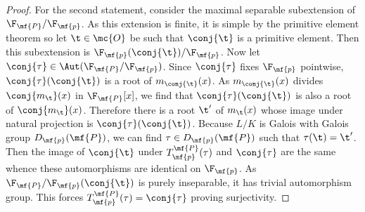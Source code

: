 \begin{proof}
      For the second statement, consider the maximal separable subextension of \(\F_{\mf{P}}/\F_{\mf{p}}\). As this extension is finite, it is simple by the primitive element theorem so let \(\t \in \mc{O}\) be such that \(\conj{\t}\) is a primitive element. Then this subextension is \(\F_{\mf{p}}(\conj{\t})/\F_{\mf{p}}\). Now let \(\conj{\tau} \in \Aut(\F_{\mf{P}}/\F_{\mf{p}})\). Since \(\conj{\tau}\) fixes \(\F_{\mf{p}}\) pointwise, \(\conj{\tau}(\conj{\t})\) is a root of \(m_{\conj{\t}}(x)\). As \(m_{\conj{\t}}(x)\) divides \(\conj{m_{\t}}(x)\) in \(\F_{\mf{P}}[x]\), we find that \(\conj{\tau}(\conj{\t})\) is also a root of \(\conj{m_{\t}}(x)\). Therefore there is a root \(\t'\) of \(m_{\t}(x)\) whose image under natural projection is \(\conj{\tau}(\conj{\t})\). Because \(L/K\) is Galois with Galois group \(D_{\mf{p}}(\mf{P})\), we can find \(\tau \in D_{\mf{p}}(\mf{P})\) such that \(\tau(\t) = \t'\). Then the image of \(\conj{\t}\) under \(T_{\mf{p}}^{\mf{P}}(\tau)\) and \(\conj{\tau}\) are the same whence these automorphisms are identical on \(\F_{\mf{p}}\). As \(\F_{\mf{P}}/\F_{\mf{p}}(\conj{\t})\) is purely inseparable, it has trivial automorphism group. This forces \(T_{\mf{p}}^{\mf{P}}(\tau) = \conj{\tau}\) proving surjectivity.
    \end{proof}

